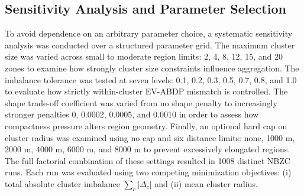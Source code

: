 \documentclass[conference]{IEEEtran}
\begin{document}
\subsection{Sensitivity Analysis and Parameter Selection}

To avoid dependence on an arbitrary parameter choice, a systematic sensitivity
analysis was conducted over a structured parameter grid. The maximum cluster
size was varied across small to moderate region limits: 2, 4, 8, 12, 15, and 20
zones to examine how strongly cluster size constraints influence aggregation.
The imbalance tolerance was tested at seven levels: 0.1,  0.2, 0.3, 0.5, 0.7, 0.8, and 1.0 to
evaluate how strictly within-cluster EV-ABDP mismatch is controlled.
The shape trade-off coefficient was varied from no shape penalty to
increasingly stronger penalties 0, 0.0002, 0.0005, and 0.0010 in order to assess how compactness pressure alters region geometry. Finally, an optional
hard cap on cluster radius was examined using no cap and six distance limits: none, 1000 m, 2000 m, 4000 m, 6000 m, and 8000 m to prevent excessively elongated regions.
The full factorial combination of these settings resulted in 1008 distinct
NBZC runs.
Each run was evaluated using two competing minimization objectives:
(i) total absolute cluster imbalance
$\sum_c |\Delta_c|$ and
(ii) mean cluster radius.
\end{document}

